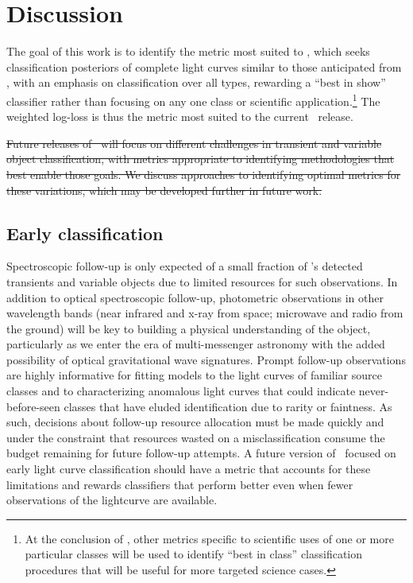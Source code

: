 \section{Discussion}
\label{sec:discussion}

The goal of this work is to identify the metric most suited to \plasticc, which seeks classification posteriors of complete light curves similar to those anticipated from \lsst, with an emphasis on classification over all types, rewarding a ``best in show'' classifier rather than focusing on any one class or scientific application.\footnote{At the conclusion of \plasticc, other metrics specific to scientific uses of one or more particular classes will be used to identify ``best in class'' classification procedures that will be useful for more targeted science cases.}
The weighted log-loss is thus the metric most suited to the current \plasticc\ release.

\sout{Future releases of \plasticc\ will focus on different challenges in transient and variable object classification, with metrics appropriate to identifying methodologies that best enable those goals.
We discuss approaches to identifying optimal metrics for these variations, which may be developed further in future work.}

\subsection{Early classification}
\label{sec:early}

Spectroscopic follow-up is only expected of a small fraction of \lsst's detected transients and variable objects due to limited resources for such observations.
In addition to optical spectroscopic follow-up, photometric observations in other wavelength bands (near infrared and x-ray from space; microwave and radio from the ground) will be key to building a physical understanding of the object, particularly as we enter the era of multi-messenger astronomy with the added possibility of optical gravitational wave signatures.
Prompt follow-up observations are highly informative for fitting models to the light curves of familiar source classes and to characterizing anomalous light curves that could indicate never-before-seen classes that have eluded identification due to rarity or faintness.
As such, decisions about follow-up resource allocation must be made quickly and under the constraint that resources wasted on a misclassification consume the budget remaining for future follow-up attempts.
A future version of \plasticc\ focused on early light curve classification should have a metric that accounts for these limitations and rewards classifiers that perform better even when fewer observations of the lightcurve are available.

